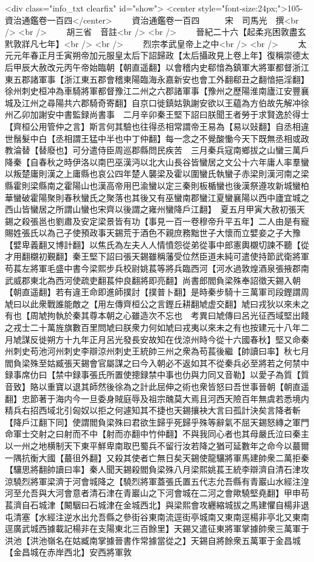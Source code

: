 <div class="info_txt clearfix" id="show">
<center style="font-size:24px;">105-資治通鑑卷一百四</center>
  　　資治通鑑卷一百四　　　宋　司馬光　撰<br />
<br />
　　胡三省　音註<br />
<br />
　　晉紀二十六【起柔兆困敦盡玄黓敦牂凡七年】<br />
<br />
　　烈宗孝武皇帝上之中<br />
<br />
　　太元元年春正月壬寅朔帝加元服皇太后下詔歸政【太后攝政見上卷上年】復稱崇德太后甲辰大赦改元丙午帝始臨朝【朝直遥翻】以會稽内史郗愔為鎮軍大將軍都督浙江東五郡諸軍事【浙江東五郡會稽東陽臨海永嘉新安也會工外翻郗丑之翻愔挹淫翻】徐州刺史桓冲為車騎將軍都督豫江二州之六郡諸軍事【豫州之歷陽淮南廬江安豐襄城及江州之尋陽共六郡騎奇寄翻】自京口徙鎮姑孰謝安欲以王藴為方伯故先解冲徐州乙卯加謝安中書監録尚書事　二月辛卯秦王堅下詔曰朕聞王者勞于求賢逸於得士【齊桓公用管仲之言】斯言何其驗也往得丞相常謂帝王易為【易以䜴翻】自丞相違世鬚髮中白【丞相謂王猛中半也中丁仲翻】每一念之不覺酸慟今天下既無丞相或政教淪替【替廢也】可分遣侍臣周巡郡縣問民疾苦　三月秦兵寇南鄉拔之山蠻三萬戶降秦【自春秋之時伊洛以南巴巫漢沔以北大山長谷皆蠻居之文公十六年庸人率羣蠻以叛楚庸則漢之上庸縣也哀公四年楚人襲梁及霍以圍蠻氏執蠻子赤梁則漢河南之梁縣霍則梁縣南之霍陽山也漢高帝用巴渝蠻以定三秦則板楯蠻也後漢祭遵攻新城蠻柏華蠻破霍陽聚則春秋蠻氏之聚落也其後又有巫蠻南郡蠻江夏蠻襄陽以西中廬宜城之西山皆蠻居之所謂山蠻也宋齊以後謂之雍州蠻降戶江翻】　夏五月甲寅大赦初張天錫之殺張邕也劉肅及安定梁景皆有功【事見一百一卷穆帝升平五年】二人由是有寵賜姓張氏以為己子使預政事天錫荒于酒色不親庶務黜世子大懷而立嬖妾之子大豫【嬖卑義翻又博計翻】以焦氏為左夫人人情憤怨從弟從事中郎憲輿櫬切諫不聽【從才用翻櫬初覲翻】秦王堅下詔曰張天錫雖稱藩受位然臣道未純可遣使持節武衛將軍苟萇左將軍毛盛中書今梁熙步兵校尉姚萇等將兵臨西河【河水過敦煌酒泉張掖郡南武威郡東北為西河使疏吏翻萇仲良翻將即亮翻】尚書郎閻負梁殊奉詔徵天錫入朝【朝直遥翻】若有違王命即進師撲討【撲普卜翻】是時秦步騎十三萬軍司段鏗謂周虓曰以此衆戰誰能敵之【用左傳齊桓公之言鏗丘耕翻虓虚交翻】虓曰戎狄以來未之有也【周虓拘執於秦其尊本朝之心雖造次不忘也　考異曰虓傳曰呂光征西域堅出餞之戎士二十萬旌旗數百里問虓曰朕衆力何如虓曰戎夷以來未之有也按建元十八年二月虓謀反徙朔方十九年正月呂光發長安故知在伐涼州時今從十六國春秋】堅又命秦州刺史苟池河州刺史李辯涼州刺史王統帥三州之衆為苟萇後繼【帥讀曰率】秋七月閻負梁殊至姑臧張天錫會官屬謀之曰今入朝必不返如其不從秦兵必至將若之何禁中録事席仂曰【禁中録事張氏所置使摠録禁中事也仂與力同又音勒】以愛子為質【質音致】賂以重寶以退其師然後徐為之計此屈伸之術也衆皆怒曰吾世事晉朝【朝直遥翻】忠節著于海内今一旦委身賊庭辱及祖宗醜莫大焉且河西天險百年無虞若悉境内精兵右招西域北引匈奴以拒之何遽知其不捷也天錫攘袂大言曰孤計決矣言降者斬【降戶江翻下同】使謂閻負梁殊曰君欲生歸乎死歸乎殊等辭氣不屈天錫怒縳之軍門命軍士交射之曰射而不中【射而亦翻中竹仲翻】不與我同心者也其母嚴氏泣曰秦主以一州之地横制天下東平鮮卑南取巴蜀兵不留行汝若降之猶可延數年之命今以蕞爾一隅抗衡大國【蕞徂外翻】又殺其使者亡無日矣天錫使龍驤將軍馬建帥衆二萬拒秦【驤思將翻帥讀曰率】秦人聞天錫殺閻負梁殊八月梁熙姚萇王統李辯濟自清石津攻涼驍烈將軍梁濟于河會城降之【驍烈將軍蓋張氏置五代志允吾縣有青巖山水經注湟河至允吾與大河會意者清石津在青巖山之下河會城在二河之會歟驍堅堯翻】甲申苟萇濟自石城津【闞駰曰石城津在金城西北】與梁熙會攻纒縮城拔之馬建懼自楊非退屯清塞【水經注逆水出允吾縣之參街谷東南流逕街亭城南又東南逕楊非亭北又東南逕廣武城西據載記楊非在支陽東北三百餘里】天錫又遣征東將軍掌據帥衆三萬軍于洪池【洪池嶺名在姑臧南掌據晉書作常據當從之】天錫自將餘衆五萬軍于金昌城【金昌城在赤岸西北】安西將軍敦